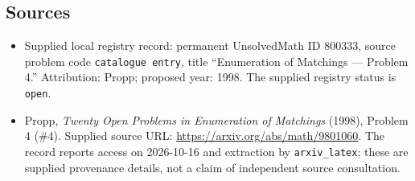 \documentclass[11pt]{article}
\begin{document}
\subsection{Sources}
\begin{itemize}
\item Supplied local registry record: permanent UnsolvedMath ID \(800333\), source problem code \texttt{catalogue entry}, title ``Enumeration of Matchings --- Problem 4.'' Attribution: Propp; proposed year: 1998. The supplied registry status is \texttt{open}.
\item Propp, \emph{Twenty Open Problems in Enumeration of Matchings} (1998), Problem 4 (\#4). Supplied source URL: \url{https://arxiv.org/abs/math/9801060}. The record reports access on 2026-10-16 and extraction by \texttt{arxiv\_latex}; these are supplied provenance details, not a claim of independent source consultation.
\end{itemize}
\end{document}
